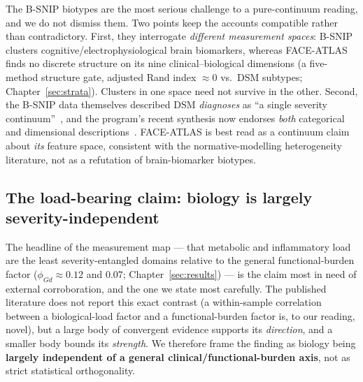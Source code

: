 \begin{caveatbox}
The B-SNIP biotypes are the most serious challenge to a pure-continuum reading, and we do not dismiss them.
Two points keep the accounts compatible rather than contradictory. First, they interrogate \emph{different
measurement spaces}: B-SNIP clusters cognitive/electrophysiological brain biomarkers, whereas FACE-ATLAS finds
no discrete structure on its nine clinical--biological dimensions (a five-method structure gate, adjusted Rand
index $\approx 0$ vs.\ DSM subtypes; Chapter~\ref{sec:strata}). Clusters in one space need not survive in the
other. Second, the B-SNIP data themselves described DSM \emph{diagnoses} as ``a single severity
continuum''~\cite{clementz2016biotypes}, and the program's recent synthesis now endorses \emph{both} categorical
and dimensional descriptions~\cite{clementz2024biotypes}. FACE-ATLAS is best read as a continuum claim about
\emph{its} feature space, consistent with the normative-modelling heterogeneity literature, not as a refutation
of brain-biomarker biotypes.
\end{caveatbox}

\subsection{The load-bearing claim: biology is largely severity-independent}
The headline of the measurement map --- that metabolic and inflammatory load are the least severity-entangled domains relative to the
general functional-burden factor ($\phi_{Gd}\approx 0.12$ and $0.07$; Chapter~\ref{sec:results}) --- is the
claim most in need of external corroboration, and the one we state most carefully. The published literature
does not report this exact contrast (a within-sample correlation between a biological-load factor and a
functional-burden factor is, to our reading, novel), but a large body of convergent evidence supports its
\emph{direction}, and a smaller body bounds its \emph{strength}. We therefore frame the finding as biology
being \textbf{largely independent of a general clinical/functional-burden axis}, not as strict statistical
orthogonality.

